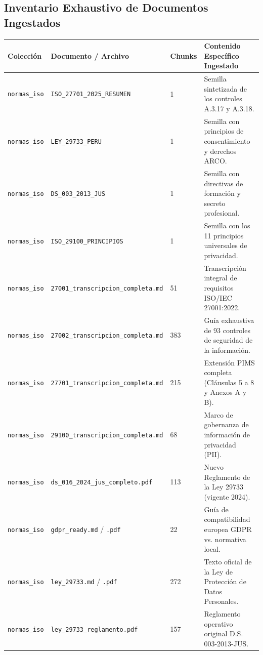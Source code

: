 \documentclass[11pt,a4paper]{article}
\begin{document}
\subsection{Inventario Exhaustivo de Documentos Ingestados}
\begin{longtable}{@{}p{3.5cm}p{4cm}p{2cm}p{6.5cm}@{}}
\toprule
\textbf{Colección} & \textbf{Documento / Archivo} & \textbf{Chunks} & \textbf{Contenido Específico Ingestado} \\ \midrule
\endhead
\texttt{normas\_iso} & \texttt{ISO\_27701\_2025\_RESUMEN} & 1 & Semilla sintetizada de los controles A.3.17 y A.3.18. \\ \midrule
\texttt{normas\_iso} & \texttt{LEY\_29733\_PERU} & 1 & Semilla con principios de consentimiento y derechos ARCO. \\ \midrule
\texttt{normas\_iso} & \texttt{DS\_003\_2013\_JUS} & 1 & Semilla con directivas de formación y secreto profesional. \\ \midrule
\texttt{normas\_iso} & \texttt{ISO\_29100\_PRINCIPIOS} & 1 & Semilla con los 11 principios universales de privacidad. \\ \midrule
\texttt{normas\_iso} & \texttt{27001\_transcripcion\_completa.md} & 51 & Transcripción integral de requisitos ISO/IEC 27001:2022. \\ \midrule
\texttt{normas\_iso} & \texttt{27002\_transcripcion\_completa.md} & 383 & Guía exhaustiva de 93 controles de seguridad de la información. \\ \midrule
\texttt{normas\_iso} & \texttt{27701\_transcripcion\_completa.md} & 215 & Extensión PIMS completa (Cláusulas 5 a 8 y Anexos A y B). \\ \midrule
\texttt{normas\_iso} & \texttt{29100\_transcripcion\_completa.md} & 68 & Marco de gobernanza de información de privacidad (PII). \\ \midrule
\texttt{normas\_iso} & \texttt{ds\_016\_2024\_jus\_completo.pdf} & 113 & Nuevo Reglamento de la Ley 29733 (vigente 2024). \\ \midrule
\texttt{normas\_iso} & \texttt{gdpr\_ready.md} / \texttt{.pdf} & 22 & Guía de compatibilidad europea GDPR vs. normativa local. \\ \midrule
\texttt{normas\_iso} & \texttt{ley\_29733.md} / \texttt{.pdf} & 272 & Texto oficial de la Ley de Protección de Datos Personales. \\ \midrule
\texttt{normas\_iso} & \texttt{ley\_29733\_reglamento.pdf} & 157 & Reglamento operativo original D.S. 003-2013-JUS. \\ \midrule

\end{longtable}
\end{document}
